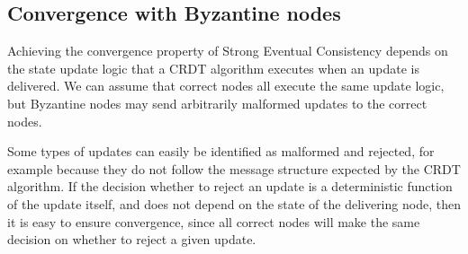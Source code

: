 \documentclass[sigplan,review]{acmart}
\begin{document}
\subsection{Convergence with Byzantine nodes}\label{sec:convergence}

Achieving the convergence property of Strong Eventual Consistency depends on the state update logic that a CRDT algorithm executes when an update is delivered.
We can assume that correct nodes all execute the same update logic, but Byzantine nodes may send arbitrarily malformed updates to the correct nodes.

Some types of updates can easily be identified as malformed and rejected, for example because they do not follow the message structure expected by the CRDT algorithm.
If the decision whether to reject an update is a deterministic function of the update itself, and does not depend on the state of the delivering node, then it is easy to ensure convergence, since all correct nodes will make the same decision on whether to reject a given update.
\end{document}
